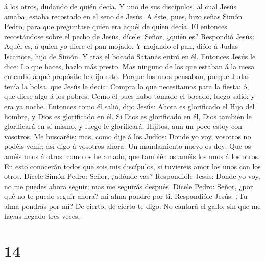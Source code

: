 á los otros, dudando de quién decía.  Y uno de sus
discípulos, al cual Jesús amaba, estaba recostado en el seno de Jesús.
 A éste, pues, hizo señas Simón Pedro, para que preguntase
quién era aquél de quien decía.  El entonces recostándose
sobre el pecho de Jesús, dícele: Señor, ¿quién es? 
Respondió Jesús: Aquél es, á quien yo diere el pan mojado. Y mojando el
pan, diólo á Judas Iscariote, hijo de Simón.  Y tras el
bocado Satanás entró en él. Entonces Jesús le dice: Lo que haces, hazlo
más presto.  Mas ninguno de los que estaban á la mesa
entendió á qué propósito le dijo esto.  Porque los unos
pensaban, porque Judas tenía la bolsa, que Jesús le decía: Compra lo que
necesitamos para la fiesta: ó, que diese algo á los pobres.
 Como él pues hubo tomado el bocado, luego salió: y era ya
noche.  Entonces como él salió, dijo Jesús: Ahora es
glorificado el Hijo del hombre, y Dios es glorificado en él.
 Si Dios es glorificado en él, Dios también le glorificará
en sí mismo, y luego le glorificará.  Hijitos, aun un poco
estoy con vosotros. Me buscaréis; mas, como dije á los Judíos: Donde yo
voy, vosotros no podéis venir; así digo á vosotros ahora. 
Un mandamiento nuevo os doy: Que os améis unos á otros: como os he
amado, que también os améis los unos á los otros.  En esto
conocerán todos que sois mis discípulos, si tuviereis amor los unos con
los otros.  Dícele Simón Pedro: Señor, ¿adónde vas?
Respondióle Jesús: Donde yo voy, no me puedes ahora seguir; mas me
seguirás después.  Dícele Pedro: Señor, ¿por qué no te
puedo seguir ahora? mi alma pondré por ti.  Respondióle
Jesús: ¿Tu alma pondrás por mí? De cierto, de cierto te digo: No cantará
el gallo, sin que me hayas negado tres veces.

\hypertarget{section-13}{%
\section{14}\label{section-13}}

